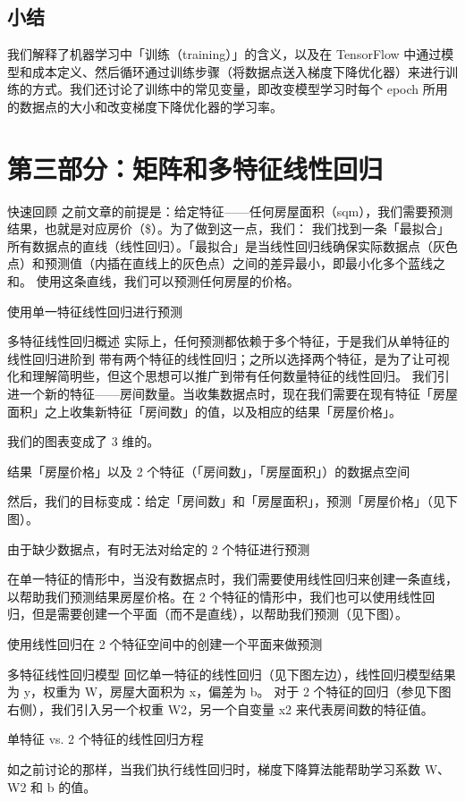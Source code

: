 \documentclass[11pt]{book} %
\begin{document}
\subsection{小结}
我们解释了机器学习中「训练（training）」的含义，以及在 TensorFlow 中通过模型和成本定义、然后循环通过训练步骤（将数据点送入梯度下降优化器）来进行训练的方式。我们还讨论了训练中的常见变量，即改变模型学习时每个 epoch 所用的数据点的大小和改变梯度下降优化器的学习率。

\section{第三部分：矩阵和多特征线性回归}
快速回顾
之前文章的前提是：给定特征——任何房屋面积（sqm），我们需要预测结果，也就是对应房价（\$）。为了做到这一点，我们：
我们找到一条「最拟合」所有数据点的直线（线性回归）。「最拟合」是当线性回归线确保实际数据点（灰色点）和预测值（内插在直线上的灰色点）之间的差异最小，即最小化多个蓝线之和。
使用这条直线，我们可以预测任何房屋的价格。

使用单一特征线性回归进行预测 

多特征线性回归概述
实际上，任何预测都依赖于多个特征，于是我们从单特征的线性回归进阶到 带有两个特征的线性回归；之所以选择两个特征，是为了让可视化和理解简明些，但这个思想可以推广到带有任何数量特征的线性回归。
我们引进一个新的特征——房间数量。当收集数据点时，现在我们需要在现有特征「房屋面积」之上收集新特征「房间数」的值，以及相应的结果「房屋价格」。

我们的图表变成了 3 维的。

结果「房屋价格」以及 2 个特征（「房间数」，「房屋面积」）的数据点空间 

然后，我们的目标变成：给定「房间数」和「房屋面积」，预测「房屋价格」（见下图）。

由于缺少数据点，有时无法对给定的 2 个特征进行预测 

在单一特征的情形中，当没有数据点时，我们需要使用线性回归来创建一条直线，以帮助我们预测结果房屋价格。在 2 个特征的情形中，我们也可以使用线性回归，但是需要创建一个平面（而不是直线），以帮助我们预测（见下图）。

使用线性回归在 2 个特征空间中的创建一个平面来做预测 

多特征线性回归模型
回忆单一特征的线性回归（见下图左边），线性回归模型结果为 y，权重为 W，房屋大面积为 x，偏差为 b。
对于 2 个特征的回归（参见下图右侧），我们引入另一个权重 W2，另一个自变量 x2 来代表房间数的特征值。


单特征 vs. 2 个特征的线性回归方程 

如之前讨论的那样，当我们执行线性回归时，梯度下降算法能帮助学习系数 W、W2 和 b 的值。
\end{document}
